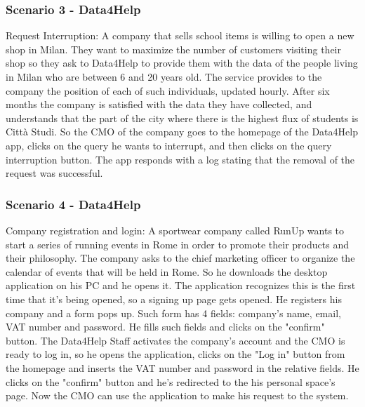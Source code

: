{\color{secblue}\subsubsection{Scenario 3 - Data4Help}}
Request Interruption:
A company that sells school items is willing to open a new shop in Milan. 
They want to maximize the number of customers visiting their shop so they ask to Data4Help to provide them with the data of the people living in Milan who are between 6 and 20 years old. 
The service provides to the company the position of each of such individuals, updated hourly.
After six months the company is satisfied with the data they have collected, and understands that the part of the city where there is the highest flux of students is Città Studi.
So the CMO of the company goes to the homepage of the Data4Help app, clicks on the query he wants to interrupt, and then clicks on the query interruption button. 
The app responds with a log stating that the removal of the request was successful.

{\color{secblue}\subsubsection{Scenario 4 - Data4Help}}
Company registration and login:
A sportwear company called RunUp wants to start a series of running events in Rome in order to
promote their products and their philosophy.
The company asks to the chief marketing officer to organize the calendar of events 
that will be held in Rome.
So he downloads the desktop application on his PC and he opens it.
The application recognizes this is the first time that it's being opened, so a signing up page gets opened.
He registers his company and a form pops up.
Such form has 4 fields: company's name, email, VAT number and password.
He fills such fields and clicks on the "confirm" button.
The Data4Help Staff activates the company's account and the CMO is ready to log in, so he opens the application, clicks on the "Log in" button from the homepage and inserts the VAT number and password in the relative fields.
He clicks on the "confirm" button and he's redirected to the his personal space's page.
Now the CMO can use the application to make his request to the system.

